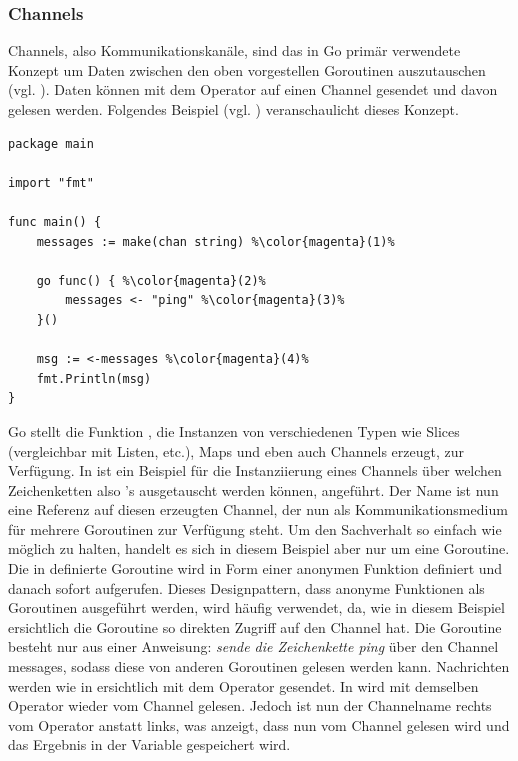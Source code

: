 \subsubsection{Channels}
Channels, also Kommunikationskanäle, sind das in Go primär verwendete Konzept um Daten zwischen den oben vorgestellen Goroutinen auszutauschen (vgl. \cite{go:channels}). Daten können mit dem \mono{<-} Operator auf einen Channel gesendet und davon gelesen werden. Folgendes Beispiel (vgl. \cite{go:channels}) veranschaulicht dieses Konzept.
\begin{lstlisting}[style=goMono,caption={Beispiel Channels},label={lst:go:sync:concurrency:ex3}]
package main

import "fmt"

func main() {
    messages := make(chan string) %\color{magenta}(1)%

    go func() { %\color{magenta}(2)%
        messages <- "ping" %\color{magenta}(3)%
    }()

    msg := <-messages %\color{magenta}(4)%
    fmt.Println(msg)
}
\end{lstlisting}
Go stellt die Funktion , die Instanzen von verschiedenen Typen wie Slices (vergleichbar mit Listen, etc.), Maps und eben auch Channels erzeugt, zur Verfügung. In  ist ein Beispiel für die Instanziierung eines Channels über welchen Zeichenketten also 's ausgetauscht werden können, angeführt. Der Name  ist nun eine Referenz auf diesen erzeugten Channel, der nun als Kommunikationsmedium für mehrere Goroutinen zur Verfügung steht. Um den Sachverhalt so einfach wie möglich zu halten, handelt es sich in diesem Beispiel aber nur um eine Goroutine. Die in  definierte Goroutine wird in Form einer anonymen Funktion definiert und danach sofort aufgerufen. Dieses Designpattern, dass anonyme Funktionen als Goroutinen ausgeführt werden, wird häufig verwendet, da, wie in diesem Beispiel ersichtlich die Goroutine so direkten Zugriff auf den Channel hat. Die Goroutine besteht nur aus einer Anweisung: \textit{sende die Zeichenkette \frqq{}ping\flqq{}} über den Channel \frqq{}messages\flqq{}, sodass diese von anderen Goroutinen gelesen werden kann. Nachrichten werden wie in  ersichtlich mit dem \mono{<-} Operator gesendet. In  wird mit demselben Operator wieder vom Channel gelesen. Jedoch ist nun der Channelname rechts vom Operator anstatt links, was anzeigt, dass nun vom Channel gelesen wird und das Ergebnis in der Variable  gespeichert wird.\bigskip

